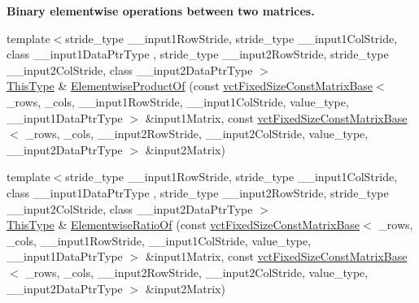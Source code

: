 \begin{Indent}{\bf Binary elementwise operations between two matrices.}
\begin{DoxyCompactItemize}
{\footnotesize template$<$stride\-\_\-type \-\_\-\-\_\-input1\-Row\-Stride, stride\-\_\-type \-\_\-\-\_\-input1\-Col\-Stride, class \-\_\-\-\_\-input1\-Data\-Ptr\-Type , stride\-\_\-type \-\_\-\-\_\-input2\-Row\-Stride, stride\-\_\-type \-\_\-\-\_\-input2\-Col\-Stride, class \-\_\-\-\_\-input2\-Data\-Ptr\-Type $>$ }\\\hyperlink{classvct_fixed_size_const_matrix_base_a7ec66a96ed7e08ce9ff54093133c9d8d}{This\-Type} \& \hyperlink{classvct_fixed_size_matrix_base_abd211cd69b870681f1a3110df2ad501c}{Elementwise\-Product\-Of} (const \hyperlink{classvct_fixed_size_const_matrix_base}{vct\-Fixed\-Size\-Const\-Matrix\-Base}$<$ \-\_\-rows, \-\_\-cols, \-\_\-\-\_\-input1\-Row\-Stride, \-\_\-\-\_\-input1\-Col\-Stride, value\-\_\-type, \-\_\-\-\_\-input1\-Data\-Ptr\-Type $>$ \&input1\-Matrix, const \hyperlink{classvct_fixed_size_const_matrix_base}{vct\-Fixed\-Size\-Const\-Matrix\-Base}$<$ \-\_\-rows, \-\_\-cols, \-\_\-\-\_\-input2\-Row\-Stride, \-\_\-\-\_\-input2\-Col\-Stride, value\-\_\-type, \-\_\-\-\_\-input2\-Data\-Ptr\-Type $>$ \&input2\-Matrix)
\item 
{\footnotesize template$<$stride\-\_\-type \-\_\-\-\_\-input1\-Row\-Stride, stride\-\_\-type \-\_\-\-\_\-input1\-Col\-Stride, class \-\_\-\-\_\-input1\-Data\-Ptr\-Type , stride\-\_\-type \-\_\-\-\_\-input2\-Row\-Stride, stride\-\_\-type \-\_\-\-\_\-input2\-Col\-Stride, class \-\_\-\-\_\-input2\-Data\-Ptr\-Type $>$ }\\\hyperlink{classvct_fixed_size_const_matrix_base_a7ec66a96ed7e08ce9ff54093133c9d8d}{This\-Type} \& \hyperlink{classvct_fixed_size_matrix_base_a0c8ec33d941089d54ffe302a922f1362}{Elementwise\-Ratio\-Of} (const \hyperlink{classvct_fixed_size_const_matrix_base}{vct\-Fixed\-Size\-Const\-Matrix\-Base}$<$ \-\_\-rows, \-\_\-cols, \-\_\-\-\_\-input1\-Row\-Stride, \-\_\-\-\_\-input1\-Col\-Stride, value\-\_\-type, \-\_\-\-\_\-input1\-Data\-Ptr\-Type $>$ \&input1\-Matrix, const \hyperlink{classvct_fixed_size_const_matrix_base}{vct\-Fixed\-Size\-Const\-Matrix\-Base}$<$ \-\_\-rows, \-\_\-cols, \-\_\-\-\_\-input2\-Row\-Stride, \-\_\-\-\_\-input2\-Col\-Stride, value\-\_\-type, \-\_\-\-\_\-input2\-Data\-Ptr\-Type $>$ \&input2\-Matrix)
\item 

\end{DoxyCompactItemize}
\end{Indent}
